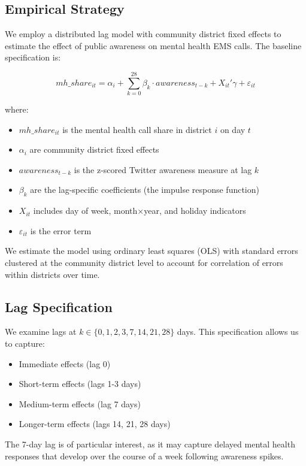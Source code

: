 \documentclass[11pt,a4paper]{article}
\begin{document}
\subsection{Empirical Strategy}

We employ a distributed lag model with community district fixed effects to estimate the effect of public awareness on mental health EMS calls. The baseline specification is:

\begin{equation}
mh\_share_{it} = \alpha_i + \sum_{k=0}^{28} \beta_k \cdot awareness_{t-k} + X_{it}' \gamma + \varepsilon_{it}
\end{equation}

where:
\begin{itemize}
    \item $mh\_share_{it}$ is the mental health call share in district $i$ on day $t$
    \item $\alpha_i$ are community district fixed effects
    \item $awareness_{t-k}$ is the z-scored Twitter awareness measure at lag $k$
    \item $\beta_k$ are the lag-specific coefficients (the impulse response function)
    \item $X_{it}$ includes day of week, month×year, and holiday indicators
    \item $\varepsilon_{it}$ is the error term
\end{itemize}

We estimate the model using ordinary least squares (OLS) with standard errors clustered at the community district level to account for correlation of errors within districts over time.

\subsection{Lag Specification}

We examine lags at $k \in \{0, 1, 2, 3, 7, 14, 21, 28\}$ days. This specification allows us to capture:
\begin{itemize}
    \item Immediate effects (lag 0)
    \item Short-term effects (lags 1-3 days)
    \item Medium-term effects (lag 7 days)
    \item Longer-term effects (lags 14, 21, 28 days)
\end{itemize}

The 7-day lag is of particular interest, as it may capture delayed mental health responses that develop over the course of a week following awareness spikes.
\end{document}
